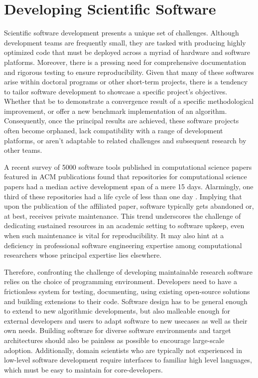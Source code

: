 \section{Developing Scientific Software}\label{chpt:1:sec:0}

Scientific software development presents a unique set of challenges. Although development teams are frequently small, they are tasked with producing highly optimized code that must be deployed across a myriad of hardware and software platforms. Moreover, there is a pressing need for comprehensive documentation and rigorous testing to ensure reproducibility. Given that many of these softwares arise within doctoral programs or other short-term projects, there is a tendency to tailor software development to showcase a specific project's objectives. Whether that be to demonstrate a convergence result of a specific methodological improvement, or offer a new benchmark implementation of an algorithm. Consequently, once the principal results are achieved, these software projects often become orphaned, lack compatibility with a range of development platforms, or aren't adaptable to related challenges and subsequent research by other teams.

A recent survey of 5000 software tools published in computational science papers featured in ACM publications found that repositories for computational science papers had a median active development span of a mere 15 days. Alarmingly, one third of these repositories had a life cycle of less than one day \cite{hasselbring2020open}. Implying that upon the publication of the affiliated paper, software typically gets abandoned or, at best, receives private maintenance. This trend underscores the challenge of dedicating sustained resources in an academic setting to software upkeep, even when such maintenance is vital for reproducibility. It may also hint at a deficiency in professional software engineering expertise among computational researchers whose principal expertise lies elsewhere.

Therefore, confronting the challenge of developing maintainable research software relies on the choice of programming environment. Developers need to have a frictionless system for testing, documenting, using existing open-source solutions and building extensions to their code. Software design has to be general enough to extend to new algorithmic developments, but also malleable enough for external developers and users to adapt software to new usecases as well as their own needs. Building software for diverse software environments and target architectures should also be painless as possible to encourage large-scale adoption. Additionally, domain scientists who are typically not experienced in low-level software development require interfaces to familiar high level languages, which must be easy to maintain for core-developers.

